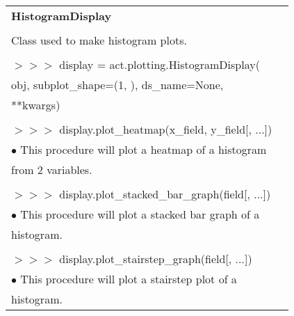 \documentclass[potrait, z1paper, fontscale=0.33]{baposter} %
\begin{document}
\begin{poster}
{\begin{flushleft}
\begin{tabular}{@{}ll@{}}
\\
\multicolumn{2}{l}{\cellcolor[HTML]{DDFFFF}\bf HistogramDisplay} \\
\\
Class used to make histogram plots.\\
\\
$>$$>$$>$ display = act.plotting.HistogramDisplay(\\
\-\hspace{1.2cm} obj, subplot\_shape=(1, ), ds\_name=None,\\
\-\hspace{1.2cm} **kwargs)\\
\\
$>$$>$$>$ display.plot\_heatmap(x\_field, y\_field[, ...])\\
\-\hspace{0.2cm} $\bullet$ This procedure will plot a heatmap of a histogram\\
\-\hspace{0.5cm} from 2 variables.\\
\\
$>$$>$$>$ display.plot\_stacked\_bar\_graph(field[, ...])\\
\-\hspace{0.2cm} $\bullet$ This procedure will plot a stacked bar graph of a\\
\-\hspace{0.5cm} histogram.\\
\\
$>$$>$$>$ display.plot\_stairstep\_graph(field[, ...])\\
\-\hspace{0.2cm} $\bullet$ This procedure will plot a stairstep plot of a\\
\-\hspace{0.5cm} histogram.\\
\end{tabular}

\end{flushleft}
}



\end{poster}
\end{document}
